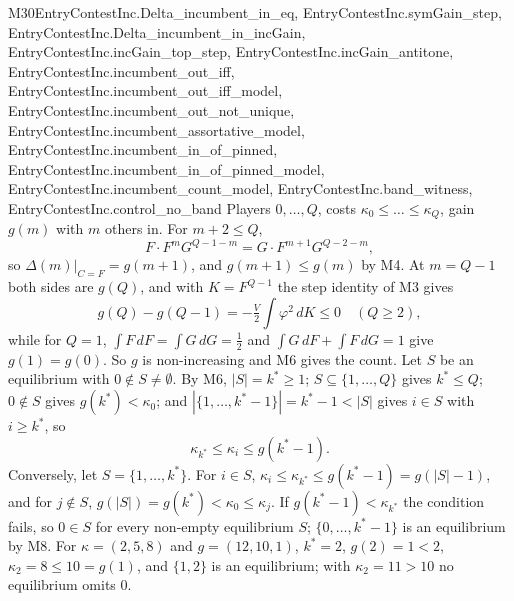 \begin{mproof}{M30}{EntryContestInc.Delta_incumbent_in_eq, EntryContestInc.symGain_step, EntryContestInc.Delta_incumbent_in_incGain, EntryContestInc.incGain_top_step, EntryContestInc.incGain_antitone, EntryContestInc.incumbent_out_iff, EntryContestInc.incumbent_out_iff_model, EntryContestInc.incumbent_out_not_unique, EntryContestInc.incumbent_assortative_model, EntryContestInc.incumbent_in_of_pinned, EntryContestInc.incumbent_in_of_pinned_model, EntryContestInc.incumbent_count_model, EntryContestInc.band_witness, EntryContestInc.control_no_band}
Players $0,\dots,Q$, costs $\kappa_0\le\dots\le\kappa_Q$, gain $g(m)$ with $m$
others in. For $m+2\le Q$,
\[
  F\cdot F^{m}G^{Q-1-m}=G\cdot F^{m+1}G^{Q-2-m},
\]
so $\Delta(m)|_{C=F}=g(m+1)$, and $g(m+1)\le g(m)$ by M4. At $m=Q-1$ both
sides are $g(Q)$, and with $K=F^{Q-1}$ the step identity of M3 gives
\[
  g(Q)-g(Q-1)=-\tfrac V2\textstyle\int\varphi^2\,dK\le0\quad(Q\ge2),
\]
while for $Q=1$, $\int F\,dF=\int G\,dG=\frac12$ and $\int G\,dF+\int F\,dG=1$ give
$g(1)=g(0)$. So $g$ is non-increasing and M6 gives the count. Let $S$ be an
equilibrium with $0\notin S\neq\emptyset$. By M6, $|S|=k^*\ge1$;
$S\subseteq\{1,\dots,Q\}$ gives $k^*\le Q$; $0\notin S$ gives
$g(k^*)<\kappa_0$; and $|\{1,\dots,k^*-1\}|=k^*-1<|S|$ gives $i\in S$ with
$i\ge k^*$, so
\[
  \kappa_{k^*}\le\kappa_i\le g(k^*-1).
\]
Conversely, let $S=\{1,\dots,k^*\}$. For $i\in S$,
$\kappa_i\le\kappa_{k^*}\le g(k^*-1)=g(|S|-1)$, and for $j\notin S$,
$g(|S|)=g(k^*)<\kappa_0\le\kappa_j$. If $g(k^*-1)<\kappa_{k^*}$ the
condition fails, so $0\in S$ for every non-empty equilibrium $S$;
$\{0,\dots,k^*-1\}$ is an equilibrium by M8. For $\kappa=(2,5,8)$ and
$g=(12,10,1)$, $k^*=2$, $g(2)=1<2$, $\kappa_2=8\le10=g(1)$, and $\{1,2\}$
is an equilibrium; with $\kappa_2=11>10$ no equilibrium omits $0$.
\end{mproof}

